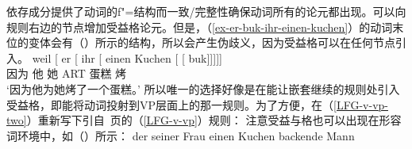 \ea
\label{lfg-vp-regel-two}
\z
依存成分提供了动词的f"=结构而一致/完整性确保动词所有的论元都出现。可以向规则右边的节点增加受益格论元。但是，（\ref{ex-er-buk-ihr-einen-kuchen}）的动词末位的变体会有（）所示的结构，所以会产生伪歧义，因为受益格可以在任何节点引入。
\ea
\gll weil    [ er [ ihr [ einen Kuchen [ [ buk]]]]]\\
     因为 {}        他 {}        她 {}        ART 蛋糕       {}        {}       烤\\
\glt `因为他为她烤了一个蛋糕。'
\z
所以唯一的选择好像是在能让嵌套继续的规则处引入受益格，即能将动词投射到VP层面上的那一规则。为了方便，在（\ref{LFG-v-vp-two}）重新写下引自~\pageref{LFG-v-vp}页的（\ref{LFG-v-vp}）规则：
\ea
\label{LFG-v-vp-two}
\z
注意受益与格也可以出现在形容词环境中，如（）所示：
\eal
\ex
\gll der seiner Frau einen Kuchen backende Mann\\
